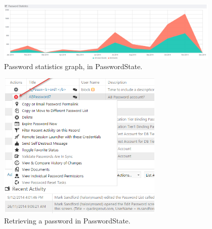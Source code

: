 			\begin{figure}[htbp]
				\centering
				\includegraphics[width=0.95\textwidth]{figures/analysis/passwordstate_graph.png}
				\caption{Password statistics graph, in PasswordState. }
				\label{fig:passwordstate_graph}
			\end{figure}

			\begin{figure}[htbp]
				\centering
				\includegraphics[width=0.7\textwidth]{figures/analysis/passwordstate_getpassword.png}
				\caption{Retrieving a password in PasswordState. }
				\label{fig:passwordstate_getpassword}
			\end{figure}

